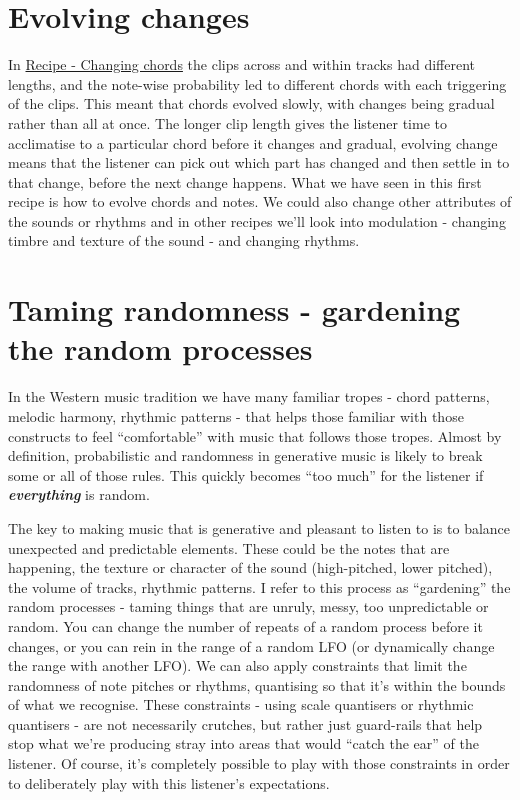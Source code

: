 \documentclass[
  12pt,
  letterpaper,
  oneside,
  open=any]{scrbook}
\begin{document}
\section{Evolving changes}\label{evolving-changes}

In \hyperref[Chapter-001-Recipe-Changing_Chords]{Recipe - Changing
chords} the clips across and within tracks had different lengths, and
the note-wise probability led to different chords with each triggering
of the clips. This meant that chords evolved slowly, with changes being
gradual rather than all at once. The longer clip length gives the
listener time to acclimatise to a particular chord before it changes and
gradual, evolving change means that the listener can pick out which part
has changed and then settle in to that change, before the next change
happens. What we have seen in this first recipe is how to evolve chords
and notes. We could also change other attributes of the sounds or
rhythms and in other recipes we'll look into modulation - changing
timbre and texture of the sound - and changing rhythms.

\section{Taming randomness - gardening the random
processes}\label{taming-randomness---gardening-the-random-processes}

In the Western music tradition we have many familiar tropes - chord
patterns, melodic harmony, rhythmic patterns - that helps those familiar
with those constructs to feel ``comfortable'' with music that follows
those tropes. Almost by definition, probabilistic and randomness in
generative music is likely to break some or all of those rules. This
quickly becomes ``too much'' for the listener if
\textbf{\emph{everything}} is random.

The key to making music that is generative and pleasant to listen to is
to balance unexpected and predictable elements. These could be the notes
that are happening, the texture or character of the sound (high-pitched,
lower pitched), the volume of tracks, rhythmic patterns. I refer to this
process as ``gardening'' the random processes - taming things that are
unruly, messy, too unpredictable or random. You can change the number of
repeats of a random process before it changes, or you can rein in the
range of a random LFO (or dynamically change the range with another
LFO). We can also apply constraints that limit the randomness of note
pitches or rhythms, quantising so that it's within the bounds of what we
recognise. These constraints - using scale quantisers or rhythmic
quantisers - are not necessarily crutches, but rather just guard-rails
that help stop what we're producing stray into areas that would ``catch
the ear'' of the listener. Of course, it's completely possible to play
with those constraints in order to deliberately play with this
listener's expectations.
\end{document}
